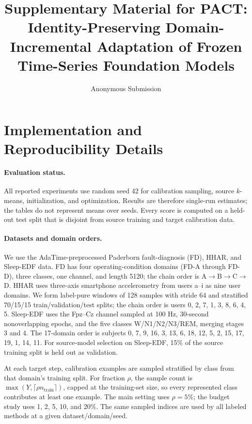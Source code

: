 \documentclass[letterpaper]{article}
\title{Supplementary Material for PACT: Identity-Preserving Domain-Incremental Adaptation of Frozen Time-Series Foundation Models}
\author{Anonymous Submission}
\begin{document}
\maketitle

\section{Implementation and Reproducibility Details}

\paragraph{Evaluation status.}
All reported experiments use random seed 42 for calibration sampling, source
$k$-means, initialization, and optimization. Results are therefore single-run
estimates; the tables do not represent means over seeds. Every score is computed
on a held-out test split that is disjoint from source training and target
calibration data.

\paragraph{Datasets and domain orders.}
We use the AdaTime-preprocessed Paderborn fault-diagnosis (FD), HHAR, and
Sleep-EDF data. FD has four operating-condition domains (FD-A through FD-D),
three classes, one channel, and length 5120; the chain order is
A$\rightarrow$B$\rightarrow$C$\rightarrow$D. HHAR uses three-axis smartphone
accelerometry from users a--i as nine user domains. We form label-pure windows
of 128 samples with stride 64 and stratified 70/15/15 train/validation/test
splits; the chain order is users 0, 2, 7, 1, 3, 8, 6, 4, 5. Sleep-EDF uses the
Fpz--Cz channel sampled at 100 Hz, 30-second nonoverlapping epochs, and the five
classes W/N1/N2/N3/REM, merging stages 3 and 4. The 17-domain order is subjects
0, 7, 9, 16, 3, 13, 6, 18, 12, 5, 2, 15, 17, 19, 1, 14, 11. For source-model
selection on Sleep-EDF, 15\% of the source training split is held out as
validation.

At each target step, calibration examples are sampled stratified by class from
that domain's training split. For fraction $\rho$, the sample count is
$\max(Y,\lceil\rho n_{\mathrm{train}}\rceil)$, capped at the training-set size,
so every represented class contributes at least one example. The main setting
uses $\rho=5\%$; the budget study uses 1, 2, 5, 10, and 20\%. The same sampled
indices are used by all labeled methods at a given dataset/domain/seed.
\end{document}
